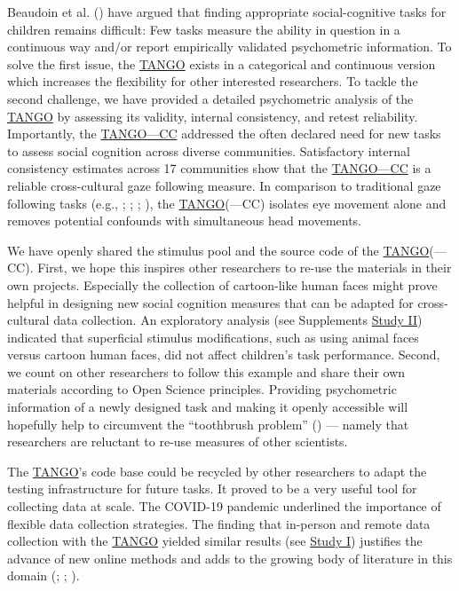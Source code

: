 \documentclass[
]{scrbook}
\begin{document}
Beaudoin et al. () have argued that finding appropriate social-cognitive tasks for children remains difficult: Few tasks measure the ability in question in a continuous way and/or report empirically validated psychometric information. To solve the first issue, the \hyperref[acronyms_TANGO]{TANGO} exists in a categorical and continuous version which increases the flexibility for other interested researchers. To tackle the second challenge, we have provided a detailed psychometric analysis of the \hyperref[acronyms_TANGO]{TANGO} by assessing its validity, internal consistency, and retest reliability. Importantly, the \hyperref[acronyms_TANGOux2014CC]{TANGO---CC} addressed the often declared need for new tasks to assess social cognition across diverse communities. Satisfactory internal consistency estimates across 17 communities show that the \hyperref[acronyms_TANGOux2014CC]{TANGO---CC} is a reliable cross-cultural gaze following measure. In comparison to traditional gaze following tasks (e.g., ; ; ; ), the \hyperref[acronyms_TANGO]{TANGO}(---CC) isolates eye movement alone and removes potential confounds with simultaneous head movements.

We have openly shared the stimulus pool and the source code of the \hyperref[acronyms_TANGO]{TANGO}(---CC). First, we hope this inspires other researchers to re-use the materials in their own projects. Especially the collection of cartoon-like human faces might prove helpful in designing new social cognition measures that can be adapted for cross-cultural data collection. An exploratory analysis (see Supplements \hyperref[studyII]{Study II}) indicated that superficial stimulus modifications, such as using animal faces versus cartoon human faces, did not affect children's task performance. Second, we count on other researchers to follow this example and share their own materials according to Open Science principles. Providing psychometric information of a newly designed task and making it openly accessible will hopefully help to circumvent the ``toothbrush problem'' () --- namely that researchers are reluctant to re-use measures of other scientists.

The \hyperref[acronyms_TANGO]{TANGO}'s code base could be recycled by other researchers to adapt the testing infrastructure for future tasks. It proved to be a very useful tool for collecting data at scale. The COVID-19 pandemic underlined the importance of flexible data collection strategies. The finding that in-person and remote data collection with the \hyperref[acronyms_TANGO]{TANGO} yielded similar results (see \hyperref[studyI]{Study I}) justifies the advance of new online methods and adds to the growing body of literature in this domain (; ; ).
\end{document}
